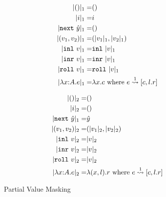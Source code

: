 %

\begin{figure*}
\begin{align*}
\masko {()}			=& () \\
\masko {i}				=& i \\
\masko {\next~\hat y}	=& () \\
\masko {(v_1,v_2)}	=& (\masko {v_1},\masko {v_2}) \\
\masko {\inl~v}		=& \inl~\masko v \\
\masko {\inr~v}		=& \inr~\masko v \\
\masko {\roll~v}		=& \roll~\masko v \\
\masko {\lam xAe}		=& \lambda x.c \text{ where } \splitone e A {c,l.r}
\end{align*}

\begin{align*}
\maskt {()}			=& () \\
\maskt {i}				=& () \\
\masko {\next~\hat y}	=& \hat y \\
\maskt {(v_1,v_2)}	=& (\maskt {v_1},\maskt {v_2}) \\
\maskt {\inl~v}		=& \maskt v \\
\maskt {\inr~v}		=& \maskt v \\
\maskt {\roll~v}		=& \maskt v \\
\maskt {\lam xAe}		=& \lambda (x,l).r \text{ where } \splitone e A {c,l.r}
\end{align*}
\caption{Partial Value Masking}
\label{fig:valMask}
\end{figure*}

